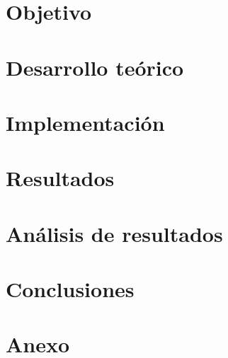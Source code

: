 


		
	
	\newpage

	\tableofcontents
	\newpage

	\graphicspath{{../docs/report/pics/}}

	\section{Objetivo}
		

	\newpage
	\section{Desarrollo teórico}
		

	\newpage
	\section{Implementación}
		

	\newpage
	\section{Resultados}
		

	\newpage
	\section{Análisis de resultados}
	

	\newpage
	\section{Conclusiones}
		

	\newpage
    \section{Anexo}
        

